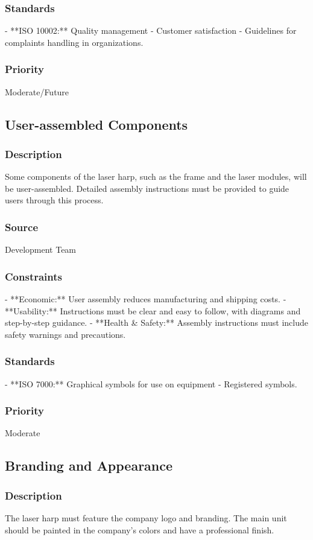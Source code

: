 \subsubsection{Standards}
- **ISO 10002:** Quality management - Customer satisfaction - Guidelines for complaints handling in organizations.
\subsubsection{Priority}
Moderate/Future

\subsection{User-assembled Components}
\subsubsection{Description}
Some components of the laser harp, such as the frame and the laser modules, will be user-assembled. Detailed assembly instructions must be provided to guide users through this process.
\subsubsection{Source}
Development Team
\subsubsection{Constraints}
- **Economic:** User assembly reduces manufacturing and shipping costs.
- **Usability:** Instructions must be clear and easy to follow, with diagrams and step-by-step guidance.
- **Health & Safety:** Assembly instructions must include safety warnings and precautions.
\subsubsection{Standards}
- **ISO 7000:** Graphical symbols for use on equipment - Registered symbols.
\subsubsection{Priority}
Moderate

\subsection{Branding and Appearance}
\subsubsection{Description}
The laser harp must feature the company logo and branding. The main unit should be painted in the company’s colors and have a professional finish.
